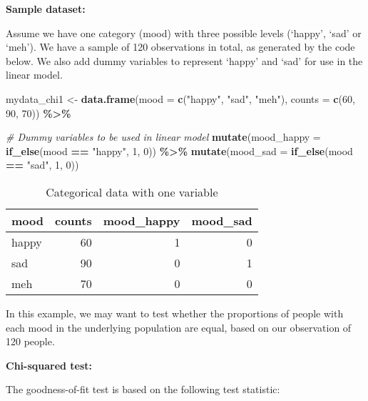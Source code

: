 \documentclass[
  12pt,
]{krantz}
\newenvironment{Shaded}{\begin{snugshade}}{\end{snugshade}}
\newcommand{\CommentTok}[1]{\textcolor[rgb]{0.56,0.35,0.01}{\textit{#1}}}
\newcommand{\DataTypeTok}[1]{\textcolor[rgb]{0.13,0.29,0.53}{#1}}
\newcommand{\DecValTok}[1]{\textcolor[rgb]{0.00,0.00,0.81}{#1}}
\newcommand{\KeywordTok}[1]{\textcolor[rgb]{0.13,0.29,0.53}{\textbf{#1}}}
\newcommand{\NormalTok}[1]{#1}
\newcommand{\OperatorTok}[1]{\textcolor[rgb]{0.81,0.36,0.00}{\textbf{#1}}}
\newcommand{\StringTok}[1]{\textcolor[rgb]{0.31,0.60,0.02}{#1}}
\begin{document}
\textbf{Sample dataset:}

Assume we have one category (mood) with three possible levels (`happy', `sad' or `meh'). We have a sample of 120 observations in total, as generated by the code below. We also add dummy variables to represent `happy' and `sad' for use in the linear model.

\begin{Shaded}
\begin{Highlighting}[]
\NormalTok{mydata\_chi1 \textless{}{-}}\StringTok{ }\KeywordTok{data.frame}\NormalTok{(}\DataTypeTok{mood =} \KeywordTok{c}\NormalTok{(}\StringTok{"happy"}\NormalTok{, }\StringTok{"sad"}\NormalTok{, }\StringTok{"meh"}\NormalTok{),}
               \DataTypeTok{counts =} \KeywordTok{c}\NormalTok{(}\DecValTok{60}\NormalTok{, }\DecValTok{90}\NormalTok{, }\DecValTok{70}\NormalTok{)) }\OperatorTok{\%\textgreater{}\%}

\StringTok{  }\CommentTok{\# Dummy variables to be used in linear model}
\StringTok{  }\KeywordTok{mutate}\NormalTok{(}\DataTypeTok{mood\_happy =} \KeywordTok{if\_else}\NormalTok{(mood }\OperatorTok{==}\StringTok{ "happy"}\NormalTok{, }\DecValTok{1}\NormalTok{, }\DecValTok{0}\NormalTok{)) }\OperatorTok{\%\textgreater{}\%}
\StringTok{  }\KeywordTok{mutate}\NormalTok{(}\DataTypeTok{mood\_sad =} \KeywordTok{if\_else}\NormalTok{(mood }\OperatorTok{==}\StringTok{ "sad"}\NormalTok{, }\DecValTok{1}\NormalTok{, }\DecValTok{0}\NormalTok{))}
\end{Highlighting}
\end{Shaded}

\begin{table}

\caption{\label{tab:unnamed-chunk-56}Categorical data with one variable}
\centering
\begin{tabular}[t]{lrrr}
\toprule
mood & counts & mood\_happy & mood\_sad\\
\midrule
happy & 60 & 1 & 0\\
sad & 90 & 0 & 1\\
meh & 70 & 0 & 0\\
\bottomrule
\end{tabular}
\end{table}

In this example, we may want to test whether the proportions of people with each mood in the underlying population are equal, based on our observation of 120 people.

\textbf{Chi-squared test:}

The goodness-of-fit test is based on the following test statistic:
\end{document}
